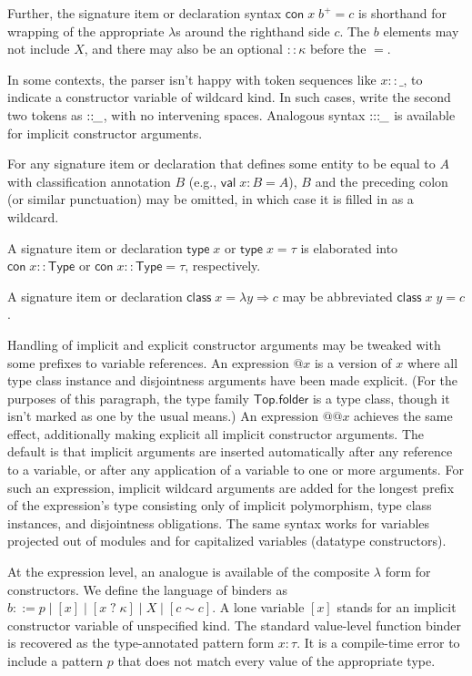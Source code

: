 \documentclass{article}
\newcommand{\mt}[1]{\mathsf{#1}}
\begin{document}
Further, the signature item or declaration syntax $\mt{con} \; x \; b^+ = c$ is shorthand for wrapping of the appropriate $\lambda$s around the righthand side $c$.  The $b$ elements may not include $X$, and there may also be an optional $:: \kappa$ before the $=$.

In some contexts, the parser isn't happy with token sequences like $x :: \_$, to indicate a constructor variable of wildcard kind.  In such cases, write the second two tokens as $::\hspace{-.05in}\_$, with no intervening spaces.  Analogous syntax $:::\hspace{-.05in}\_$ is available for implicit constructor arguments.

For any signature item or declaration that defines some entity to be equal to $A$ with classification annotation $B$ (e.g., $\mt{val} \; x : B = A$), $B$ and the preceding colon (or similar punctuation) may be omitted, in which case it is filled in as a wildcard.

A signature item or declaration $\mt{type} \; x$ or $\mt{type} \; x = \tau$ is elaborated into $\mt{con} \; x :: \mt{Type}$ or $\mt{con} \; x :: \mt{Type} = \tau$, respectively.

A signature item or declaration $\mt{class} \; x = \lambda y \Rightarrow c$ may be abbreviated $\mt{class} \; x \; y = c$.

Handling of implicit and explicit constructor arguments may be tweaked with some prefixes to variable references.  An expression $@x$ is a version of $x$ where all type class instance and disjointness arguments have been made explicit.  (For the purposes of this paragraph, the type family $\mt{Top.folder}$ is a type class, though it isn't marked as one by the usual means.)  An expression $@@x$ achieves the same effect, additionally making explicit all implicit constructor arguments.  The default is that implicit arguments are inserted automatically after any reference to a variable, or after any application of a variable to one or more arguments.  For such an expression, implicit wildcard arguments are added for the longest prefix of the expression's type consisting only of implicit polymorphism, type class instances, and disjointness obligations.  The same syntax works for variables projected out of modules and for capitalized variables (datatype constructors).

At the expression level, an analogue is available of the composite $\lambda$ form for constructors.  We define the language of binders as $b ::= p \mid [x] \mid [x \; ? \; \kappa] \mid X \mid [c \sim c]$.  A lone variable $[x]$ stands for an implicit constructor variable of unspecified kind.  The standard value-level function binder is recovered as the type-annotated pattern form $x : \tau$.  It is a compile-time error to include a pattern $p$ that does not match every value of the appropriate type.
\end{document}
